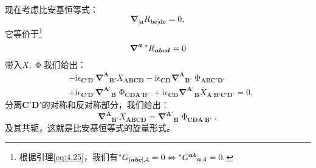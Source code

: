 现在考虑比安基恒等式：
\begin{equation*}
	\boldsymbol{\nabla }_{[\boldsymbol{a}} R_{\boldsymbol{bc}]\boldsymbol{de}} =0,
\end{equation*}
它等价于\footnote{根据引理\ref{eq:4.25}，我们有$\prescript{*}{}{} G_{[\boldsymbol{abc}]\mathcal{A}} =0\Leftrightarrow \prescript{*}{}{} G^{\boldsymbol{ab}}{}_{\boldsymbol{a}\mathcal{A}} =0.$}
\begin{equation*}
	\boldsymbol{\nabla }^{\boldsymbol{a}}\prescript{*}{}{} R_{\boldsymbol{abcd}} =0
\end{equation*}
带入$X,\upPhi $我们给出：
\begin{equation*}
	\begin{aligned}
		& -\mathrm{i} \epsilon _{\boldsymbol{C} '\boldsymbol{D} '}\boldsymbol{\nabla }^{\boldsymbol{A}}{}_{\boldsymbol{B} '} X_{\boldsymbol{ABCD}} -\mathrm{i} \epsilon _{\boldsymbol{CD}}\boldsymbol{\nabla }^{\boldsymbol{A}}{}_{\boldsymbol{B} '} \upPhi _{\boldsymbol{ABC} '\boldsymbol{D} '}\\
		& +\mathrm{i} \epsilon _{\boldsymbol{C} '\boldsymbol{D} '}\boldsymbol{\nabla }^{\boldsymbol{A} '}{}_{\boldsymbol{B}} \upPhi _{\boldsymbol{CDA} '\boldsymbol{B} '} +\mathrm{i} \epsilon _{\boldsymbol{CD}}\boldsymbol{\nabla }^{\boldsymbol{A} '}{}_{\boldsymbol{B}}\overline{X}_{\boldsymbol{A} '\boldsymbol{B} '\boldsymbol{C} '\boldsymbol{D} '} =0,
	\end{aligned}
\end{equation*}
分离$\boldsymbol{C} '\boldsymbol{D} '$的对称和反对称部分，我们给出：
\begin{equation}
	\boldsymbol{\nabla }^{\boldsymbol{A}}{}_{\boldsymbol{B} '} X_{\boldsymbol{ABCD}} =\boldsymbol{\nabla }^{\boldsymbol{A} '}{}_{\boldsymbol{B}} \upPhi _{\boldsymbol{CDA} '\boldsymbol{B} '} ,
	\label{eq:5.71}
\end{equation}
及其共轭，这就是比安基恒等式的旋量形式。



